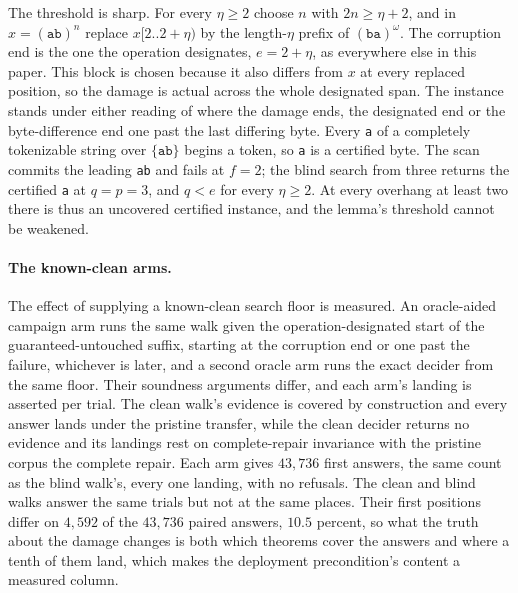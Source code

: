 \documentclass[11pt,a4paper]{article}
\theoremstyle{definition}
\theoremstyle{plain}
\theoremstyle{remark}
\newcommand{\code}[1]{\texttt{#1}}
\newcommand{\window}[3]{#1[#2..#3)}
\begin{document}
The threshold is sharp. For every $\eta \ge 2$ choose $n$ with $2n \ge \eta + 2$, and in $x = (\code{ab})^n$ replace
$\window{x}{2}{2+\eta}$ by the length-$\eta$ prefix of $(\code{ba})^\omega$. The corruption end is the one the operation
designates, $e = 2 + \eta$, as everywhere else in this paper. This block is chosen because it also differs from $x$ at
every replaced position, so the damage is actual across the whole designated span. The instance stands under either
reading of where the damage ends, the designated end or the byte-difference end one past the last differing byte. Every
\code{a} of a completely tokenizable string over $\{\code{ab}\}$ begins a token, so \code{a} is a certified byte. The
scan commits the leading \code{ab} and fails at $f = 2$; the blind search from three returns the certified \code{a} at
$q = p = 3$, and $q < e$ for every $\eta \ge 2$. At every overhang at least two there is thus an uncovered certified
instance, and the lemma's threshold cannot be weakened.

\paragraph{The known-clean arms.} The effect of supplying a known-clean search floor is measured. An oracle-aided
campaign arm runs the same walk given the operation-designated start of the guaranteed-untouched suffix, starting at the
corruption end or one past the failure, whichever is later, and a second oracle arm runs the exact decider from the same
floor. Their soundness arguments differ, and each arm's landing is asserted per trial. The clean walk's evidence is
covered by construction and every answer lands under the pristine transfer, while the clean decider returns no evidence
and its landings rest on complete-repair invariance with the pristine corpus the complete repair. Each arm gives
$43{,}736$ first answers, the same count as the blind walk's, every one landing, with no refusals. The clean and blind
walks answer the same trials but not at the same places. Their first positions differ on $4{,}592$ of the $43{,}736$
paired answers, $10.5$ percent, so what the truth about the damage changes is both which theorems cover the answers and
where a tenth of them land, which makes the deployment precondition's content a measured column.
\end{document}
